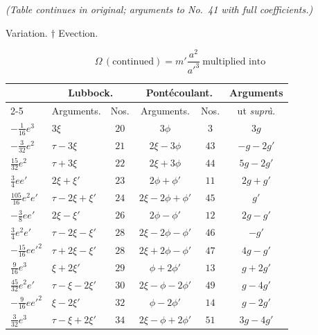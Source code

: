 \documentclass[12pt,a4paper]{article}
\theoremstyle{plain}
\begin{document}
\smallskip
\noindent\hbox{}\hfill\textit{(Table continues in original; arguments to No.~41 with full coefficients.)}

\medskip
\noindent\hbox{}\hfill\small * Variation. \quad $\dagger$ Evection.

\newpage
{}
\[
\Omega\,(\text{continued})=m'\frac{a^{2}}{a'^{3}}\ \text{multiplied into}
\]

\begin{center}
\small
\begin{tabular}{|l|l|c|c|c|c|}
\hline
& \multicolumn{2}{c|}{Lubbock.} & \multicolumn{2}{c|}{Pont\'ecoulant.} & Arguments \\
\cline{2-5}
& Arguments. & Nos. & Arguments. & Nos. & ut \textit{supr\`a}. \\
\hline
$-\tfrac{1}{16}e^{3}$                & $3\xi$            & $20$ & $3\phi$        & $3$   & $3g$ \\
$-\tfrac{3}{32}e^{2}$                & $\tau-3\xi$       & $21$ & $2\xi-3\phi$   & $43$  & $-g-2g'$ \\
$\tfrac{15}{32}e^{2}$                & $\tau+3\xi$       & $22$ & $2\xi+3\phi$   & $44$  & $5g-2g'$ \\
$\tfrac{3}{4}ee'$                    & $2\xi+\xi'$       & $23$ & $2\phi+\phi'$  & $11$  & $2g+g'$ \\
$\tfrac{105}{16}e^{2}e'$             & $\tau-2\xi+\xi'$  & $24$ & $2\xi-2\phi+\phi'$ & $45$ & $g'$ \\
$-\tfrac{3}{8}ee'$                   & $2\xi-\xi'$       & $26$ & $2\phi-\phi'$  & $12$  & $2g-g'$ \\
$\tfrac{3}{4}e^{2}e'$                & $\tau-2\xi-\xi'$  & $28$ & $2\xi-2\phi-\phi'$ & $46$ & $-g'$ \\
$-\tfrac{15}{16}ee'^{2}$             & $\tau+2\xi-\xi'$  & $28$ & $2\xi+2\phi-\phi'$ & $47$ & $4g-g'$ \\
$\tfrac{9}{16}e^{3}$                 & $\xi+2\xi'$       & $29$ & $\phi+2\phi'$  & $13$  & $g+2g'$ \\
$\tfrac{45}{32}e^{2}e'$              & $\tau-\xi-2\xi'$  & $30$ & $2\xi-\phi-2\phi'$ & $49$ & $g-4g'$ \\
$-\tfrac{9}{16}ee'^{2}$              & $\xi-2\xi'$       & $32$ & $\phi-2\phi'$  & $14$  & $g-2g'$ \\
$\tfrac{3}{32}e^{3}$                 & $\tau-\xi+2\xi'$  & $34$ & $2\xi-\phi+2\phi'$ & $51$ & $3g-4g'$ \\
\hline
\end{tabular}
\end{center}
\end{document}

